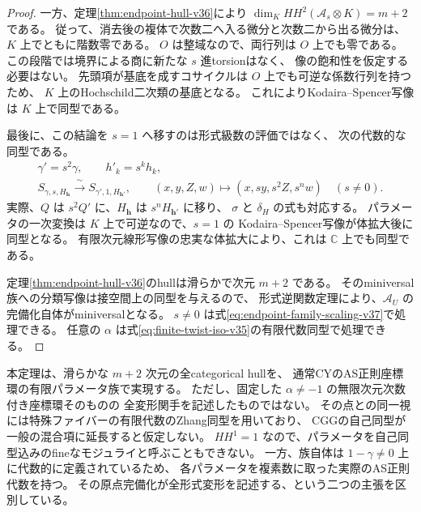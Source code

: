 \begin{proof}
一方、定理\ref{thm:endpoint-hull-v36}により
$\dim_K HH^2(\mathcal A_s\otimes K)=m+2$ である。
従って、消去後の複体で次数二へ入る微分と次数二から出る微分は、
$K$ 上でともに階数零である。
$O$ は整域なので、両行列は $O$ 上でも零である。
この段階では境界による商に新たな $s$ 進torsionはなく、
像の飽和性を仮定する必要はない。
先頭項が基底を成すコサイクルは $O$ 上でも可逆な係数行列を持つため、
$K$ 上のHochschild二次類の基底となる。
これによりKodaira--Spencer写像は $K$ 上で同型である。

最後に、この結論を $s=1$ へ移すのは形式級数の評価ではなく、
次の代数的な同型である。
\begin{equation}
\label{eq:endpoint-family-scaling-v37}
\begin{gathered}
 \gamma'=s^2\gamma,\qquad h'_k=s^k h_k,\\
 S_{\gamma,s,H_{\mathbf h}}
 \xrightarrow{\ \sim\ }S_{\gamma',1,H_{\mathbf h'}},\qquad
 (x,y,Z,w)\longmapsto(x,sy,s^2Z,s^n w)
 \quad(s\ne0).
\end{gathered}
\end{equation}
実際、$Q$ は $s^2Q'$ に、$H_{\mathbf h}$ は $s^nH_{\mathbf h'}$ に移り、
$\sigma$ と $\delta_H$ の式も対応する。
パラメータの一次変換は $K$ 上で可逆なので、$s=1$ の
Kodaira--Spencer写像が体拡大後に同型となる。
有限次元線形写像の忠実な体拡大により、これは $\mathbb C$ 上でも同型である。

定理\ref{thm:endpoint-hull-v36}のhullは滑らかで次元 $m+2$ である。
そのminiversal族への分類写像は接空間上の同型を与えるので、
形式逆関数定理により、$\mathcal A_U$ の完備化自体がminiversalとなる。
$s\ne0$ は式\eqref{eq:endpoint-family-scaling-v37}で処理できる。
任意の $\alpha$ は式\eqref{eq:finite-twist-iso-v35}の有限代数同型で処理できる。
\end{proof}

\begin{remark}[得られた実現の範囲]
本定理は、滑らかな $m+2$ 次元の全categorical hullを、
通常CYのAS正則座標環の有限パラメータ族で実現する。
ただし、固定した $\alpha\ne-1$ の無限次元次数付き座標環そのものの
全変形関手を記述したものではない。
その点との同一視には特殊ファイバーの有限代数のZhang同型を用いており、
CGGの自己同型が一般の混合項に延長すると仮定しない。
$HH^1=1$ なので、パラメータを自己同型込みのfineなモジュライと呼ぶこともできない。
一方、族自体は $1-\gamma\ne0$ 上に代数的に定義されているため、
各パラメータを複素数に取った実際のAS正則代数を持つ。
その原点完備化が全形式変形を記述する、という二つの主張を区別している。
\end{remark}
